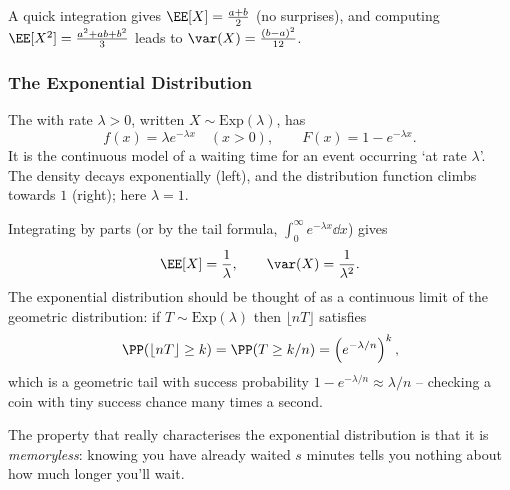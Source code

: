 A quick integration gives $\EE[X] = \frac{a + b}{2}$ (no surprises), and computing $\EE[X^2] = \frac{a^2 + ab + b^2}{3}$ leads to $\var(X) = \frac{(b-a)^2}{12}$.

\subsubsection*{The Exponential Distribution}

The  with rate $\lambda > 0$, written $X \sim \mathrm{Exp}(\lambda)$, has
$$
f(x) = \lambda e^{-\lambda x} \quad (x > 0), \qquad F(x) = 1 - e^{-\lambda x}.
$$
It is the continuous model of a waiting time for an event occurring `at rate $\lambda$'. The density decays exponentially (left), and the distribution function climbs towards $1$ (right); here $\lambda = 1$.

\begin{center}
\qquad
{}
\end{center}

Integrating by parts (or by the tail formula, $\int_0^\infty e^{-\lambda x}\dd x$) gives
$$
\EE[X] = \frac{1}{\lambda}, \qquad \var(X) = \frac{1}{\lambda^2}.
$$
The exponential distribution should be thought of as a continuous limit of the geometric distribution: if $T \sim \mathrm{Exp}(\lambda)$ then $\lfloor nT \rfloor$ satisfies
$$
\PP(\lfloor nT \rfloor \geq k) = \PP(T \geq k/n) = \left(e^{-\lambda/n}\right)^k,
$$
which is a geometric tail with success probability $1 - e^{-\lambda/n} \approx \lambda/n$ -- checking a coin with tiny success chance many times a second.

The property that really characterises the exponential distribution is that it is \emph{memoryless}: knowing you have already waited $s$ minutes tells you nothing about how much longer you'll wait.

